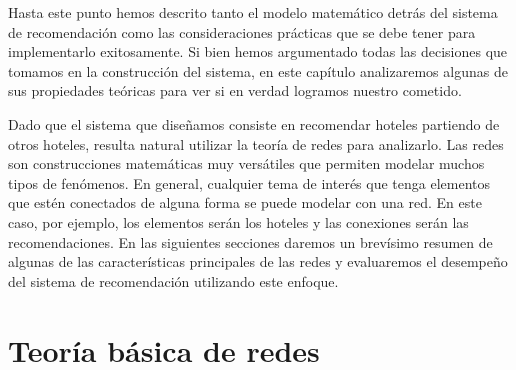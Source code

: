 \documentclass[12pt]{report}
\begin{document}
Hasta este punto hemos descrito tanto el modelo matemático detrás del sistema de recomendación como las consideraciones prácticas que se debe tener para implementarlo exitosamente. Si bien hemos argumentado todas las decisiones que tomamos en la construcción del sistema, en este capítulo analizaremos algunas de sus propiedades teóricas para ver si en verdad logramos nuestro cometido.

Dado que el sistema que diseñamos consiste en recomendar hoteles partiendo de otros hoteles, resulta natural utilizar la teoría de redes para analizarlo. Las redes son construcciones matemáticas muy versátiles que permiten modelar muchos tipos de fenómenos. En general, cualquier tema de interés que tenga elementos que estén conectados de alguna forma se puede modelar con una red. En este caso, por ejemplo, los elementos serán los hoteles y las conexiones serán las recomendaciones. En las siguientes secciones daremos un brevísimo resumen de algunas de las características principales de las redes y evaluaremos el desempeño del sistema de recomendación utilizando este enfoque.

\section{Teoría básica de redes}
\end{document}
